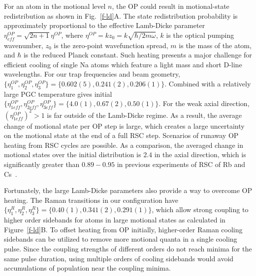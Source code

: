\documentclass[aps,prl,twocolumn,groupedaddress]{revtex4-1}
\newcommand{\eff}{ef\! f}
\begin{document}
For an atom in the motional level $n$, the OP could result in motional-state redistribution
as shown in Fig.~\ref{f-ld}A. The state redistribution probability
is approximately proportional to the effective Lamb-Dicke parameter
$\eta^{OP}_{\eff}=\sqrt{2n+1}\eta^{OP}$, where $\eta^{OP}=k z_0=k \sqrt{\hbar/2m\omega}$,
$k$ is the optical pumping wavenumber, $z_0$ is the zero-point wavefunction spread,
$m$ is the mass of the atom, and $\hbar$ is the reduced Planck constant.
Such heating presents a major challenge for efficient cooling of single Na atoms
which feature a light mass and short D-line wavelengths.
For our trap frequencies and beam geometry,
$\{\eta^{OP}_1,\eta^{OP}_2,\eta^{OP}_3\} = \{0.602(5), 0.241(2), 0.206(1)\}$.
Combined with a relatively large PGC temperature gives initial
$\{\eta^{OP}_{1\eff},\eta^{OP}_{2\eff},\eta^{OP}_{3\eff}\} = \{4.0(1), 0.67(2), 0.50(1)\}$.
For the weak axial direction, $(\eta^{OP}_{1\eff})^2>1$ is far outside of the Lamb-Dicke regime.
As a result, the average change of motional state per OP step is large,
which creates a large uncertainty on the motional state at the end of a full RSC step.
Scenarios of runaway OP heating from RSC cycles are possible.
As a comparison, the averaged change in motional states over the initial distribution
is $2.4$ in the axial direction, which is significantly greater than $0.89-0.95$
in previous experiments of RSC of Rb and Cs~\cite{Li2012,Kaufman2012,Thompson2013,Liu2017}.

Fortunately, the large Lamb-Dicke parameters also provide a way to overcome OP heating.
The Raman transitions in our configuration have
$\{\eta^R_{1},\eta^R_{2},\eta^R_{3}\} = \{0.40(1), 0.341(2), 0.291(1)\}$,
which allow strong coupling to higher order sidebands for atoms in large motional states
as calculated in Figure~\ref{f-ld}B.
To offset heating from OP initially, higher-order Raman cooling sidebands can be utilized
to remove more motional quanta in a single cooling pulse.
Since the coupling strengths of different orders do not reach minima for the same pulse duration,
using multiple orders of cooling sidebands would avoid accumulations of population
near the coupling minima.
\end{document}
